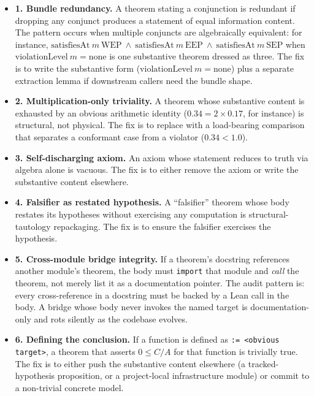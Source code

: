 \documentclass[11pt]{article}
\begin{document}
\begin{itemize}

\item \textbf{1. Bundle redundancy.} A theorem stating a
conjunction is redundant if dropping any conjunct produces a
statement of equal information content. The pattern occurs when
multiple conjuncts are algebraically equivalent: for instance,
$\mathrm{satisfiesAt}\ m\ \mathrm{WEP}\ \wedge\ \mathrm{satisfiesAt}\
m\ \mathrm{EEP}\ \wedge\ \mathrm{satisfiesAt}\ m\ \mathrm{SEP}$ when
$\mathrm{violationLevel}\ m = \mathrm{none}$ is one substantive
theorem dressed as three. The fix is to write the substantive form
($\mathrm{violationLevel}\ m = \mathrm{none}$) plus a separate
extraction lemma if downstream callers need the bundle shape.

\item \textbf{2. Multiplication-only triviality.} A theorem
whose substantive content is exhausted by an obvious arithmetic
identity ($0.34 = 2 \times 0.17$, for instance) is structural, not
physical. The fix is to replace with a load-bearing comparison
that separates a conformant case from a violator
($0.34 < 1.0$).

\item \textbf{3. Self-discharging axiom.} An axiom whose
statement reduces to truth via algebra alone is vacuous. The fix
is to either remove the axiom or write the substantive content
elsewhere.

\item \textbf{4. Falsifier as restated hypothesis.} A
``falsifier'' theorem whose body restates its hypotheses without
exercising any computation is structural-tautology repackaging.
The fix is to ensure the falsifier exercises the hypothesis.

\item \textbf{5. Cross-module bridge integrity.} If a
theorem's docstring references another module's theorem, the body
must \texttt{import} that module and \emph{call} the theorem,
not merely list it as a documentation pointer. The audit pattern
is: every cross-reference in a docstring must be backed by a Lean
call in the body. A bridge whose body never invokes the named
target is documentation-only and rots silently as the codebase
evolves.

\item \textbf{6. Defining the conclusion.} If a function is
defined as \texttt{:= <obvious target>}, a theorem that asserts
$0 \leq C/A$ for that function is trivially true. The fix is to
either push the substantive content elsewhere (a tracked-hypothesis
proposition, or a project-local infrastructure module) or commit to
a non-trivial concrete model.

\end{itemize}
\end{document}
